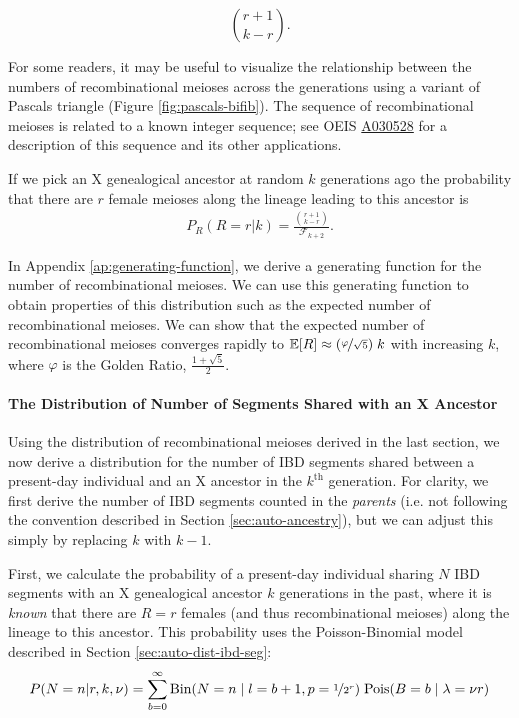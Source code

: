 \documentclass[11pt]{article}
\newcommand{\E}{\mathbb{E}}
\begin{document}
\begin{equation}
{ r + 1 \choose k - r}.
\end{equation}

For some readers, it may be useful to visualize the relationship between the
numbers of recombinational meioses across the generations using a variant of
Pascals triangle (Figure \ref{fig:pascals-bifib}). The sequence of
recombinational meioses is related to a known integer sequence; see OEIS
\href{https://oeis.org/A030528}{A030528} \citep{sloane2014online} for a
description of this sequence and its other applications.

If we pick an X genealogical ancestor at random $k$ generations ago the
probability that there are $r$ female meioses along the lineage leading to this
ancestor is
\begin{align}
  \label{eq:recomb-pmf}
  P_R(R = r | k) = \frac{{r + 1 \choose k - r}}{\mathcal{F}_{k+2}}.
\end{align}

In Appendix \ref{ap:generating-function}, we derive a generating function for
the number of recombinational meioses. We can use this generating function to
obtain properties of this distribution such as the expected number of
recombinational meioses. We can show that the expected number of
recombinational meioses converges rapidly to $\E[R] \approx
(\nicefrac{\varphi}{\sqrt{5}}) \; k$ with increasing $k$, where $\varphi$ is
the Golden Ratio, $\frac{1 + \sqrt{5}}{2}$.

\paragraph{The Distribution of Number of Segments Shared with an X Ancestor}

Using the distribution of recombinational meioses derived in the last section,
we now derive a distribution for the number of IBD segments shared between a
present-day individual and an X ancestor in the $k^\text{th}$ generation. For
clarity, we first derive the number of IBD segments counted in the
\emph{parents} (i.e. not following the convention described in Section
\ref{sec:auto-ancestry}), but we can adjust this simply by replacing $k$ with
$k-1$.

First, we calculate the probability of a present-day individual sharing $N$ IBD
segments with an X genealogical ancestor $k$ generations in the past, where it
is \emph{known} that there are $R=r$ females (and thus recombinational meioses)
along the lineage to this ancestor. This probability uses the Poisson-Binomial
model described in Section \ref{sec:auto-dist-ibd-seg}:
%
\begin{equation}
  \label{eq:likelihood-n}
  P(N=n | r, k, \nu) = \sum_{b=0}^\infty \text{Bin}(N=n \;|\; l=b+1, p=\nicefrac{1}{2^r}) \; \text{Pois}(B=b \;|\; \lambda=\nu r)
\end{equation}
%
\end{document}
